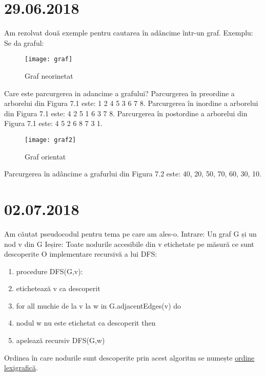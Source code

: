 \documentclass{report}
\begin{document}
\chapter{29.06.2018}
Am rezolvat două exemple pentru cautarea în adâncime  într-un graf.
Exemplu: 
Se da graful: \newline
\begin{figure}[ht]
\centering
\texttt{[image: graf]}
\caption{Graf neorinetat}
\end{figure}
Care este parcurgerea in adancime a grafului?\newline
Parcurgerea în preordine a arborelui din Figura 7.1 este: 1 2 4 5 3 6 7 8. \newline
Parcurgerea în inordine a arborelui din Figura 7.1 este: 4 2 5 1 6 3 7 8. \newline
Parcurgerea în postordine a arborelui din Figura 7.1 este: 4 5 2 6 8 7 3 1. 
\begin{figure}[ht]
\centering
\texttt{[image: graf2]}
\caption{Graf orientat}
\end{figure}
\newline
Parcurgerea în adâncime a grafurlui din Figura 7.2 este: 40, 20, 50, 70, 60, 30, 10.

\chapter{02.07.2018}
Am căutat pseudocodul pentru tema pe care am ales-o.\newline
\hspace*{0.5cm}Intrare: Un graf G și un nod v din G\newline
\hspace*{0.5cm}Ieșire: Toate nodurile accesibile din v etichetate pe măsură ce sunt descoperite\newline
\hspace*{0.5cm}O implementare recursivă a lui DFS:\newline
\begin{enumerate}
\item procedure DFS(G,v):
\item  etichetează v ca descoperit
\item  for all muchie de la v la w in G.adjacentEdges(v) do
\item    \hspace*{1cm} nodul w nu este etichetat ca descoperit then
\item     \hspace{1cm}apelează recursiv DFS(G,w)
\end{enumerate}
\hspace*{0.5cm}Ordinea în care nodurile sunt descoperite prin acest algoritm se numește \underline{ordine lexigrafică}.
\end{document}
